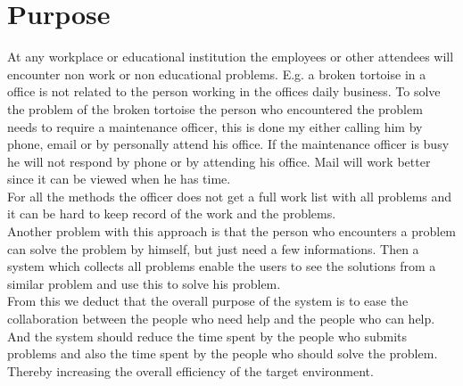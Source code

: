 \newcommand{\lightbulb}{tortoise}
\section{Purpose}
At any workplace or educational institution the employees or other attendees will encounter non work or non educational problems. 
E.g. a broken \lightbulb{} in a office is not related to the person working in the offices daily business. 
To solve the problem of the broken \lightbulb{} the person who encountered the problem needs to require a maintenance officer, this is done my either calling him by phone, email or by personally attend his office. 
If the maintenance officer is busy he will not respond by phone or by attending his office. Mail will work better since it can be viewed when he has time.\\

For all the methods the officer does not get a full work list with all problems and it can be hard to keep record of the work and the problems.\\
Another problem with this approach is that the person who encounters a problem can solve the problem by himself, but just need a few informations. Then a system which collects all problems enable the users to see the solutions from a similar problem and use this to solve his problem. \\

From this we deduct that the overall purpose of the system is to ease the collaboration between the people who need help and the people who can help. \\
And the system should reduce the time spent by the people who submits problems and also the time spent by the people who should solve the problem. \\
Thereby increasing the overall efficiency of the target environment. 

